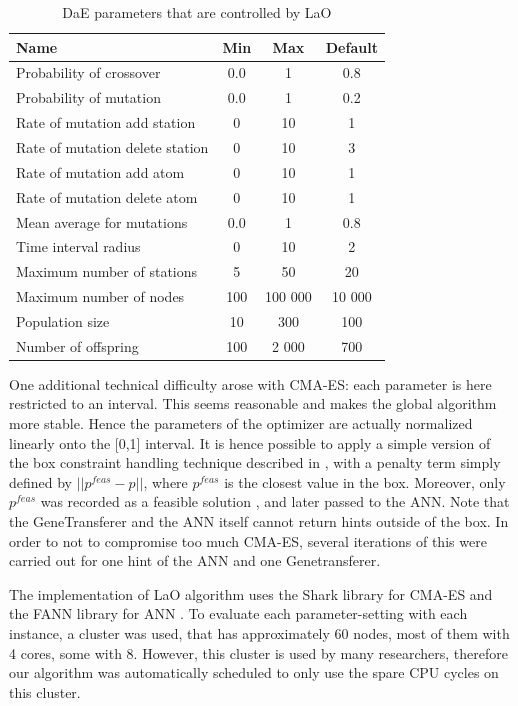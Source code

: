 \documentclass{MYsig-alternate}
\begin{document}
\begin{table}[ht]
\centering
\begin{tabular}{l c c c}
\hline\hline
Name & Min & Max & Default \\ 
\hline
Probability of crossover & 0.0 & 1 & 0.8 \\
Probability of mutation & 0.0& 1& 0.2 \\
Rate of mutation add station& 0& 10& 1 \\
Rate of mutation delete station& 0& 10& 3 \\
Rate of mutation add atom& 0& 10& 1 \\
Rate of mutation delete atom& 0& 10& 1 \\
Mean average for mutations& 0.0& 1& 0.8 \\
Time interval radius& 0& 10& 2 \\
Maximum number of stations& 5& 50& 20 \\
Maximum number of nodes& 100& 100 000& 10 000 \\
Population size& 10& 300& 100 \\
Number of offspring & 100& 2 000& 700 \\
\hline
\end{tabular}
\caption{DaE parameters that are controlled by LaO}
\label{table:parameters}
\end{table} 


One additional technical difficulty arose with CMA-ES: each parameter is here restricted to an interval. This seems reasonable and makes the global algorithm more stable. Hence the parameters of the optimizer are actually normalized linearly onto the [0,1] interval. It is hence possible to apply a simple version of the box constraint handling technique described in \cite{hansen2009tec}, with a penalty term simply defined by \begin{math}||p^{feas}-p|| \end{math}, where \begin{math}p^{feas}\end{math} is the closest value in the box. Moreover, only \begin{math}p^{feas}\end{math} was recorded as a feasible solution , and later passed to the ANN. Note that the GeneTransferer and the ANN itself cannot return hints outside of the box. In order to not to compromise too much CMA-ES, several iterations of this were carried out for one hint of the ANN and one Genetransferer.

The implementation of LaO algorithm uses the Shark library \cite{shark08} for CMA-ES and the FANN library for ANN \cite{nissen}. To evaluate each parameter-setting with each instance,  a cluster was used, that has approximately 60 nodes, most of them with 4 cores, some with 8. However, this cluster is used by many researchers, therefore our algorithm was automatically scheduled to only use the spare CPU cycles on this cluster.
\end{document}
